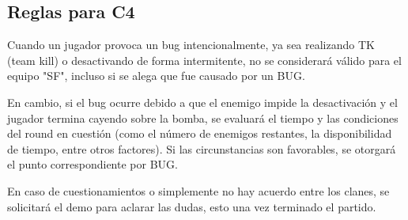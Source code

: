 \documentclass[a4paper, 11pt]{article}
\begin{document}
    \subsection{Reglas para C4}

    Cuando un jugador provoca un bug intencionalmente, ya sea realizando TK (team kill) o desactivando de forma intermitente, no se considerará válido para el equipo "SF", incluso si se alega que fue causado por un BUG. 
    
    En cambio, si el bug ocurre debido a que el enemigo impide la desactivación y el jugador termina cayendo sobre la bomba, se evaluará el tiempo y las condiciones del round en cuestión (como el número de enemigos restantes, la disponibilidad de tiempo, entre otros factores). Si las circunstancias son favorables, se otorgará el punto correspondiente por BUG.

    En caso de cuestionamientos o simplemente no hay acuerdo entre los clanes, se solicitará el demo para aclarar las dudas, esto una vez terminado el partido.
    
\end{document}
